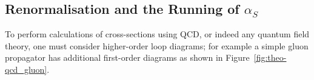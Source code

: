

\subsection{Renormalisation and the Running of $\alpha_S$}
\label{sec:theo-qcd_dijet_running}

To perform calculations of cross-sections using QCD, or indeed any quantum field theory, one must consider higher-order loop diagrams;
for example a simple gluon propagator has additional first-order diagrams as shown in Figure~\ref{fig:theo-qcd_gluon}.

